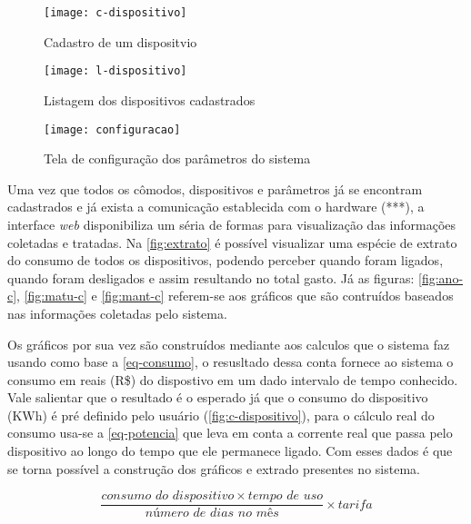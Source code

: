 \begin{figure}[h!]
	\texttt{[image: c-dispositivo]}
	\centering
	\caption[Cadastro de um dispositivo]{Cadastro de um dispositvio}
	\label{fig:c-dispositivo} 
\end{figure}
\FloatBarrier

\begin{figure}[h!]
	\texttt{[image: l-dispositivo]}
	\centering
	\caption[Listagem dos dispositivos cadastrados]{Listagem dos dispositivos cadastrados}
	\label{fig:l-dispositivo} 
\end{figure}
\FloatBarrier

\begin{figure}[h!]
	\texttt{[image: configuracao]}
	\centering
	\caption[Tela de configuração dos parâmetros do sistema]{Tela de configuração dos parâmetros do sistema}
	\label{fig:configuracao-ft} 
\end{figure}
\FloatBarrier

Uma vez que todos os cômodos, dispositivos e parâmetros já se encontram cadastrados e já exista a comunicação establecida com o hardware (***), a interface
\textit{web} disponibiliza um séria de formas para visualização das informações coletadas e tratadas. Na \autoref{fig:extrato} é possível visualizar
uma espécie de extrato do consumo de todos os dispositivos, podendo perceber quando foram ligados, quando foram desligados e assim resultando no total gasto.
Já as figuras: \ref{fig:ano-c}, \ref{fig:matu-c} e \ref{fig:mant-c} referem-se aos gráficos que são contruídos baseados nas informações coletadas pelo sistema.

Os gráficos por sua vez são construídos mediante aos calculos que o sistema faz usando como base a \autoref{eq-consumo}, o resusltado dessa conta
fornece ao sistema o consumo em reais (R\$) do dispostivo em um dado intervalo de tempo conhecido. Vale salientar que o resultado é o esperado já que o consumo
do dispositivo (KWh) é pré definido pelo usuário (\autoref{fig:c-dispositivo}), para o cálculo real do consumo usa-se a \autoref{eq-potencia} que leva em conta a corrente real que passa
pelo dispositivo ao longo do tempo que ele permanece ligado. Com esses dados é que se torna possível a construção dos gráficos e extrado presentes no sistema.

\begin{equation} \label{eq-consumo}
	\frac{consumo \, \, do \, \, dispositivo \times tempo \, \, de \, \, uso}{número \, \, de \, \, dias \, \, no \, \, mês} \times tarifa
\end{equation}

